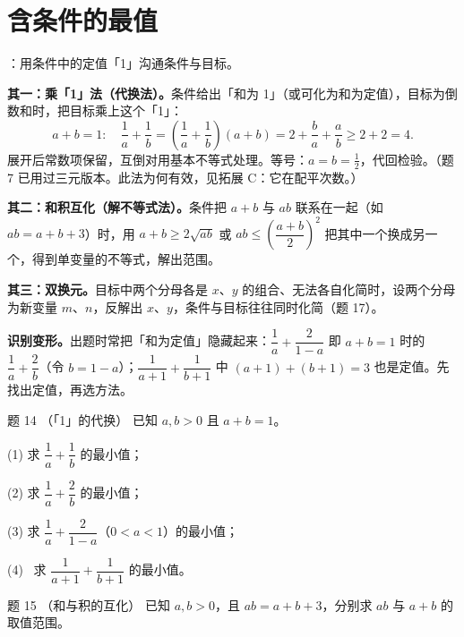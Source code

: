 \section{含条件的最值}

\begin{strand}
：用条件中的定值「1」沟通条件与目标。
\end{strand}


\textbf{其一：乘「1」法（代换法）。}条件给出「和为 1」（或可化为和为定值），目标为倒数和时，把目标乘上这个「1」：
\[
a+b=1:\quad \frac1a+\frac1b=\left(\frac1a+\frac1b\right)(a+b)=2+\frac ba+\frac ab\ge 2+2=4.
\]
展开后常数项保留，互倒对用基本不等式处理。等号：$a=b=\tfrac12$，代回检验。（题 7 已用过三元版本。此法为何有效，见拓展 C：它在配平次数。）

\textbf{其二：和积互化（解不等式法）。}条件把 $a+b$ 与 $ab$ 联系在一起（如 $ab=a+b+3$）时，用 $a+b\ge 2\sqrt{ab}$ 或 $ab\le\left(\dfrac{a+b}2\right)^2$ 把其中一个换成另一个，得到单变量的不等式，解出范围。

\textbf{其三：双换元。}目标中两个分母各是 $x$、$y$ 的组合、无法各自化简时，设两个分母为新变量 $m$、$n$，反解出 $x$、$y$，条件与目标往往同时化简（题 17）。

\textbf{识别变形。}出题时常把「和为定值」隐藏起来：$\dfrac1a+\dfrac{2}{1-a}$ 即 $a+b=1$ 时的 $\dfrac1a+\dfrac2b$（令 $b=1-a$）；$\dfrac{1}{a+1}+\dfrac{1}{b+1}$ 中 $(a+1)+(b+1)=3$ 也是定值。先找出定值，再选方法。

\begin{problem}{题 14 （「1」的代换）}
已知 $a,b>0$ 且 $a+b=1$。

(1) 求 $\dfrac1a+\dfrac1b$ 的最小值；

(2) 求 $\dfrac1a+\dfrac2b$ 的最小值；

(3) 求 $\dfrac1a+\dfrac{2}{1-a}$（$0<a<1$）的最小值；

(4) \starred\ 求 $\dfrac{1}{a+1}+\dfrac{1}{b+1}$ 的最小值。
\end{problem}

\begin{problem}{题 15 \starred（和与积的互化）}
已知 $a,b>0$，且 $ab=a+b+3$，分别求 $ab$ 与 $a+b$ 的取值范围。
\end{problem}


